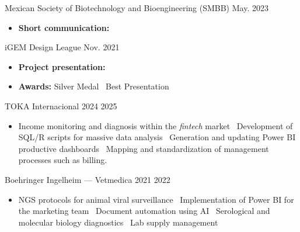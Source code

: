 \documentclass{simplecv}
\newcommand{\mydot}{\raisebox{0.5 ex}{.}\ }
\begin{document}

    {Mexican Society of Biotechnology and Bioengineering (SMBB)} %
    {} %
    {} %
    {May. 2023} %
    {
        \vspace{-11pt}
        \begin{itemize}[leftmargin=*]
        \setlength{\itemsep}{0cm}
            \item \textbf{Short communication:}  
        \end{itemize}
    } %

    {iGEM Design League} %
    {} %
    {} %
    {Nov. 2021} %
    {
        \vspace{-11pt}
        \begin{itemize}[leftmargin=*]
        \setlength{\itemsep}{0cm}
            \item \textbf{Project presentation:}  
            \item \textbf{Awards:} Silver Medal \mydot Best Presentation
        \end{itemize}
    } %


    {TOKA Internacional}
    {}
    {2024}
    {2025}
    {
     \vspace{-11pt}
     \begin{itemize}[leftmargin=*]
     \setlength{\itemsep}{0cm}
         \item Income monitoring and diagnosis within the \textit{fintech} market \mydot Development of SQL/R scripts for massive data analysis \mydot Generation and updating Power BI productive dashboards \mydot Mapping and standardization of management processes such as billing.
     \end{itemize}
    }

        {Boehringer Ingelheim --- Vetmedica}
        {}
        {2021}
        {2022}
        {%
            \vspace{-11pt}
            \begin{itemize}[leftmargin=*]
            \setlength{\itemsep}{0cm}
                \item NGS protocols for animal viral surveillance \mydot Implementation of Power BI for the marketing team \mydot Document automation using AI \mydot Serological and molecular biology diagnostics \mydot Lab supply management
            \end{itemize}
        }
\end{document}
